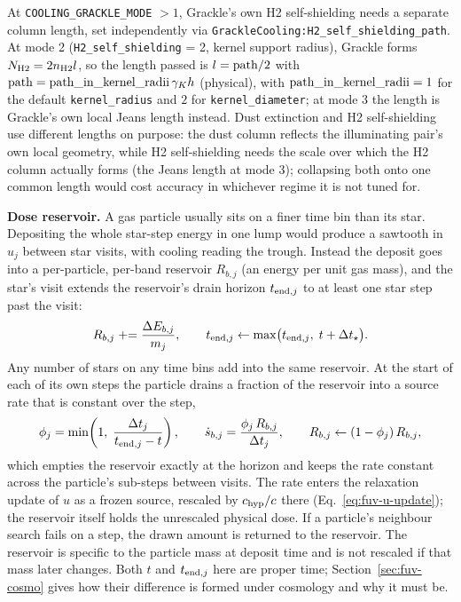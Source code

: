 At \texttt{COOLING\_GRACKLE\_MODE} $>1$, Grackle's own H2
self-shielding needs a separate column length, set independently via
\texttt{GrackleCooling:H2\_self\_shielding\_path}. At mode 2
(\texttt{H2\_self\_shielding} = 2, kernel support radius), Grackle forms
$N_{\rm H2} = 2 n_{\rm H2} l$, so the length passed is
$l = {\rm path}/2$ with ${\rm path} = {\rm path\_in\_kernel\_radii}\,
\gamma_K h$ (physical), with ${\rm path\_in\_kernel\_radii} = 1$ for the default
\texttt{kernel\_radius} and $2$ for \texttt{kernel\_diameter}; at mode 3 the length is Grackle's own local
Jeans length instead. Dust extinction and H2 self-shielding use
different lengths on purpose: the dust column reflects the illuminating
pair's own local geometry, while H2 self-shielding needs the scale over
which the H2 column actually forms (the Jeans length at mode 3);
collapsing both onto one common length would cost accuracy in whichever
regime it is not tuned for.

\textbf{Dose reservoir.} A gas particle usually sits on a finer time
bin than its star. Depositing the whole star-step energy in one lump
would produce a sawtooth in $u_j$ between star visits, with cooling
reading the trough. Instead the deposit goes into a per-particle,
per-band reservoir $R_{b,j}$ (an energy per unit gas mass), and the star's visit
extends the reservoir's drain horizon $t_{{\rm end},j}$ to at least one
star step past the visit:
\begin{equation}
  R_{b,j} \mathrel{+}= \frac{\Delta E_{b,j}}{m_j} , \qquad
  t_{{\rm end},j} \leftarrow \max\!\big(t_{{\rm end},j},\; t + \Delta t_\star\big) .
  \label{eq:fuv-reservoir}
\end{equation}
Any number of stars on any time bins add into the same reservoir. At
the start of each of its own steps the particle drains a fraction of
the reservoir into a source rate that is constant over the step,
\begin{equation}
  \phi_j = \min\!\left(1,\;\frac{\Delta t_j}{t_{{\rm end},j} - t}\right) ,
  \qquad
  \dot s_{b,j} = \frac{\phi_j\,R_{b,j}}{\Delta t_j} , \qquad
  R_{b,j} \leftarrow (1-\phi_j)\,R_{b,j} ,
  \label{eq:fuv-drain}
\end{equation}
which empties the reservoir exactly at the horizon and keeps the rate
constant across the particle's sub-steps between visits. The rate
enters the relaxation update of $u$ as a frozen source, rescaled by
$c_{\rm hyp}/c$ there (Eq.~\ref{eq:fuv-u-update}); the reservoir itself
holds the unrescaled physical dose. If a particle's neighbour search
fails on a step, the drawn amount is returned to the reservoir. The
reservoir is specific to the particle mass at deposit time and is not
rescaled if that mass later changes. Both $t$ and $t_{{\rm end},j}$ here
are proper time; Section~\ref{sec:fuv-cosmo} gives how their
difference is formed under cosmology and why it must be.

